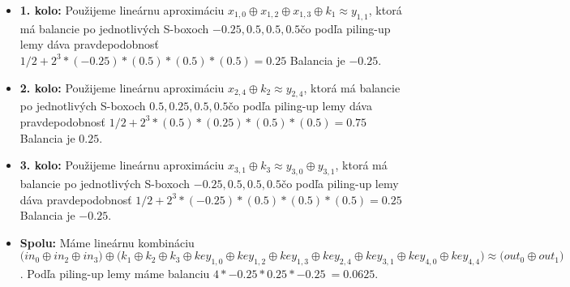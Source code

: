 \begin{itemize}
\item {\bf 1. kolo:}
Použijeme lineárnu aproximáciu $
x_{1,0} \oplus x_{1,2} \oplus x_{1,3}  \oplus k_{1} 
 \approx 
y_{1,1} $,
ktorá má balancie po jednotlivých S-boxoch $
-0.25,0.5,0.5,0.5
$čo podľa piling-up lemy dáva pravdepodobnosť 
$1/2 + 2^3*( -0.25)*(0.5)*(0.5)*(0.5 )= 0.25 $
Balancia je $-0.25$.

\item {\bf 2. kolo:}
Použijeme lineárnu aproximáciu $
x_{2,4}  \oplus k_{2} 
 \approx 
y_{2,4} $,
ktorá má balancie po jednotlivých S-boxoch $
0.5,0.25,0.5,0.5
$čo podľa piling-up lemy dáva pravdepodobnosť 
$1/2 + 2^3*( 0.5)*(0.25)*(0.5)*(0.5 )= 0.75 $
Balancia je $0.25$.

\item {\bf 3. kolo:}
Použijeme lineárnu aproximáciu $
x_{3,1}  \oplus k_{3} 
 \approx 
y_{3,0} \oplus y_{3,1} $,
ktorá má balancie po jednotlivých S-boxoch $
-0.25,0.5,0.5,0.5
$čo podľa piling-up lemy dáva pravdepodobnosť 
$1/2 + 2^3*( -0.25)*(0.5)*(0.5)*(0.5 )= 0.25 $
Balancia je $-0.25$.

\item {\bf Spolu:}  Máme lineárnu kombináciu $ \Big(
in_{0} \oplus in_{2} \oplus in_{3}
\Big) \oplus \Big( k_1 \oplus k_2 \oplus k_3 \oplus 
key_{1,0} \oplus key_{1,2} \oplus key_{1,3} \oplus key_{2,4} \oplus key_{3,1} \oplus key_{4,0} \oplus key_{4,4} \Big) \approx \Big(
out_{0} \oplus out_{1}
\Big) $.
Podľa piling-up lemy máme balanciu $4* -0.25*0.25*-0.25 ~= 0.0625 $.
\end{itemize}
